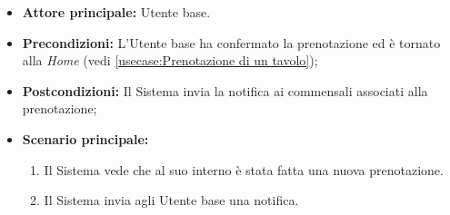 \label{usecase:Notifica ai commensali}
\begin{itemize}
	\item \textbf{Attore principale:} Utente base.
	
	\item \textbf{Precondizioni:} L'Utente base ha confermato la prenotazione ed è tornato alla \textit{Home} (vedi \autoref{usecase:Prenotazione di un tavolo});

    
	\item \textbf{Postcondizioni:} Il Sistema invia la notifica ai commensali associati alla prenotazione;
     
	\item \textbf{Scenario principale:}
	      \begin{enumerate}
                \item Il Sistema vede che al suo interno è stata fatta una nuova prenotazione.
                \item Il Sistema invia agli Utente base  una notifica.
	      \end{enumerate}
\end{itemize}